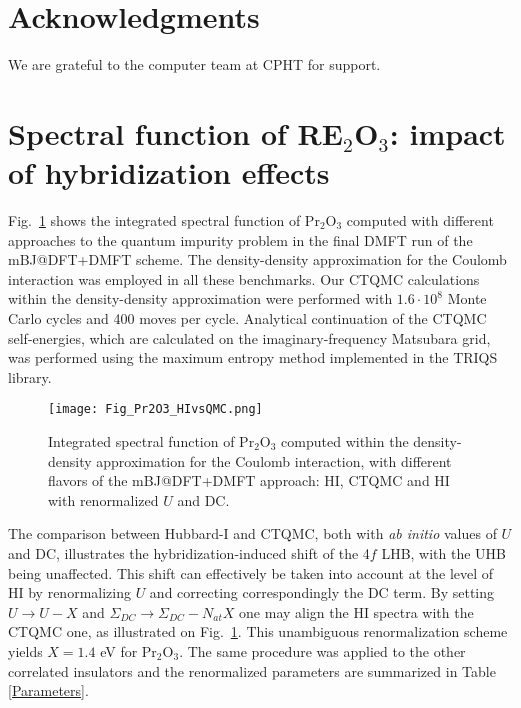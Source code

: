 \documentclass[aps,prb,twocolumn,amsmath,amssymb]{revtex4}
\begin{document}
\section*{Acknowledgments}
We are grateful to the computer team at
CPHT for support.

\appendix
 \section{Spectral function of RE$_2$O$_3$: impact of hybridization effects}

Fig.~\ref{HIvsQMC} shows the integrated spectral function of Pr$_{2}$O$_{3}$ computed with different approaches to the quantum impurity problem in the final DMFT run  of the mBJ@DFT+DMFT scheme. The density-density approximation for the Coulomb interaction was employed in all these benchmarks. Our CTQMC calculations within the density-density approximation were performed with $1.6\cdot 10^{8}$ Monte Carlo cycles and 400 moves per cycle. Analytical continuation of the CTQMC self-energies, which are calculated on the imaginary-frequency Matsubara grid, was performed using the maximum entropy method implemented in the TRIQS library\cite{maxent}.

\begin{figure}[!h]
	\begin{centering}
		\texttt{[image: Fig\_Pr2O3\_HIvsQMC.png]}
		\par\end{centering}
	\caption{Integrated spectral function of Pr$_{2}$O$_{3}$ computed within the density-density approximation for the Coulomb interaction, with different flavors of the mBJ@DFT+DMFT approach: HI, CTQMC and HI with renormalized $U$ and DC.} 
	\label{HIvsQMC} 
\end{figure}

The comparison between Hubbard-I and CTQMC, both with \textit{ab initio} values of $U$ and DC, illustrates the hybridization-induced shift of the 4$f$ LHB, with the UHB being unaffected. This shift can effectively be taken into account at the level of HI by renormalizing  $U$  and  correcting correspondingly the DC term. By  setting $U \rightarrow U-X$ and $\Sigma_{DC} \rightarrow \Sigma_{DC}-N_{at}X$ one may align the HI spectra with the CTQMC one, as illustrated on Fig.~\ref{HIvsQMC}. This unambiguous renormalization scheme yields $X=1.4$ eV for Pr$_{2}$O$_{3}$. The same procedure was applied to the other correlated insulators and the renormalized parameters are summarized in Table \ref{Parameters}.
\end{document}
